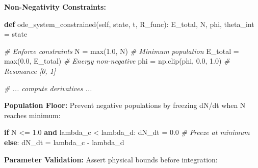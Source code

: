 \documentclass[
]{article}
\newenvironment{Shaded}{}{}
\newcommand{\BuiltInTok}[1]{\textcolor[rgb]{0.00,0.50,0.00}{#1}}
\newcommand{\CommentTok}[1]{\textcolor[rgb]{0.38,0.63,0.69}{\textit{#1}}}
\newcommand{\ControlFlowTok}[1]{\textcolor[rgb]{0.00,0.44,0.13}{\textbf{#1}}}
\newcommand{\FloatTok}[1]{\textcolor[rgb]{0.25,0.63,0.44}{#1}}
\newcommand{\KeywordTok}[1]{\textcolor[rgb]{0.00,0.44,0.13}{\textbf{#1}}}
\newcommand{\NormalTok}[1]{#1}
\newcommand{\OperatorTok}[1]{\textcolor[rgb]{0.40,0.40,0.40}{#1}}
\newcommand{\VariableTok}[1]{\textcolor[rgb]{0.10,0.09,0.49}{#1}}
\begin{document}
\textbf{Non-Negativity Constraints:}

\begin{Shaded}
\begin{Highlighting}[]
\KeywordTok{def}\NormalTok{ ode\_system\_constrained(}\VariableTok{self}\NormalTok{, state, t, R\_func):}
\NormalTok{    E\_total, N, phi, theta\_int }\OperatorTok{=}\NormalTok{ state}

    \CommentTok{\# Enforce constraints}
\NormalTok{    N }\OperatorTok{=} \BuiltInTok{max}\NormalTok{(}\FloatTok{1.0}\NormalTok{, N)              }\CommentTok{\# Minimum population}
\NormalTok{    E\_total }\OperatorTok{=} \BuiltInTok{max}\NormalTok{(}\FloatTok{0.0}\NormalTok{, E\_total)  }\CommentTok{\# Energy non{-}negative}
\NormalTok{    phi }\OperatorTok{=}\NormalTok{ np.clip(phi, }\FloatTok{0.0}\NormalTok{, }\FloatTok{1.0}\NormalTok{) }\CommentTok{\# Resonance [0, 1]}

    \CommentTok{\# ... compute derivatives ...}
\end{Highlighting}
\end{Shaded}

\textbf{Population Floor:} Prevent negative populations by freezing
dN/dt when N reaches minimum:

\begin{Shaded}
\begin{Highlighting}[]
\ControlFlowTok{if}\NormalTok{ N }\OperatorTok{\textless{}=} \FloatTok{1.0} \KeywordTok{and}\NormalTok{ lambda\_c }\OperatorTok{\textless{}}\NormalTok{ lambda\_d:}
\NormalTok{    dN\_dt }\OperatorTok{=} \FloatTok{0.0}  \CommentTok{\# Freeze at minimum}
\ControlFlowTok{else}\NormalTok{:}
\NormalTok{    dN\_dt }\OperatorTok{=}\NormalTok{ lambda\_c }\OperatorTok{{-}}\NormalTok{ lambda\_d}
\end{Highlighting}
\end{Shaded}

\textbf{Parameter Validation:} Assert physical bounds before
integration:
\end{document}
